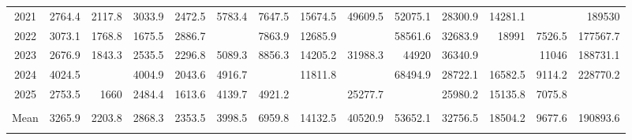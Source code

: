 \begin{longtable}[t]{crrrrrrrrrrrrr}
2021 & 2764.4 & 2117.8 & 3033.9 & 2472.5 & 5783.4 & 7647.5 & 15674.5 & 49609.5 & 52075.1 & 28300.9 & 14281.1 & \cellcolor{green}{5769.4} & 189530\\
2022 & 3073.1 & 1768.8 & 1675.5 & 2886.7 & \cellcolor{red}{6738.8} & 7863.9 & 12685.9 & \cellcolor{green}{23112.1} & 58561.6 & 32683.9 & 18991 & 7526.5 & 177567.7\\
2023 & 2676.9 & 1843.3 & 2535.5 & 2296.8 & 5089.3 & 8856.3 & 14205.2 & 31988.3 & 44920 & 36340.9 & \cellcolor{red}{26932.7} & 11046 & 188731.1\\
2024 & 4024.5 & \cellcolor{red}{4309.2} & 4004.9 & 2043.6 & 4916.7 & \cellcolor{red}{11805.6} & 11811.8 & \cellcolor{red}{62940.1} & 68494.9 & 28722.1 & 16582.5 & 9114.2 & 228770.2\\
2025 & 2753.5 & 1660 & 2484.4 & 1613.6 & 4139.7 & 4921.2 & \cellcolor{green}{11727.4} & 25277.7 & \cellcolor{green}{28003.3} & 25980.2 & 15135.8 & 7075.8 & \cellcolor{green}{130772.4}\\
\midrule
\cellcolor{red}{Max} & \cellcolor{red}{4921.7} & \cellcolor{red}{4309.2} & \cellcolor{red}{5540.3} & \cellcolor{red}{3520.1} & \cellcolor{red}{6738.8} & \cellcolor{red}{11805.6} & \cellcolor{red}{17504.2} & \cellcolor{red}{62940.1} & \cellcolor{red}{74535.1} & \cellcolor{red}{48337.7} & \cellcolor{red}{26932.7} & \cellcolor{red}{18145.8} & \cellcolor{red}{229532.5}\\
Mean & 3265.9 & 2203.8 & 2868.3 & 2353.5 & 3998.5 & 6959.8 & 14132.5 & 40520.9 & 53652.1 & 32756.5 & 18504.2 & 9677.6 & 190893.6\\
\cellcolor{green}{Min} & \cellcolor{green}{1523.2} & \cellcolor{green}{1121.3} & \cellcolor{green}{1564.7} & \cellcolor{green}{1544.9} & \cellcolor{green}{2100.4} & \cellcolor{green}{4530.3} & \cellcolor{green}{11727.4} & \cellcolor{green}{23112.1} & \cellcolor{green}{28003.3} & \cellcolor{green}{22242.8} & \cellcolor{green}{14269.1} & \cellcolor{green}{5769.4} & \cellcolor{green}{130772.4}\\*
\end{longtable}
